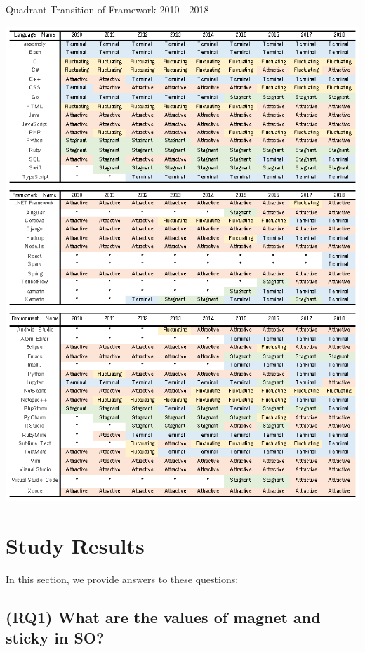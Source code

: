\documentclass[conference]{IEEEtran}
\begin{document}
\begin{table}[t]
 \centering
 \caption{Quadrant Transition of Framework 2010 - 2018} 
 \includegraphics[width=1.0\hsize]{img/AFSTnew.eps} 
 \label{table1} 
\end{table}


\section{Study Results} %
In this section, we provide answers to these questions:
\subsection{(RQ1) What are the values of magnet and sticky in SO?}
\end{document}
